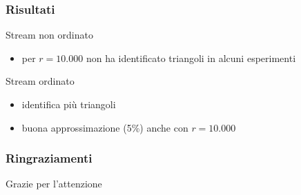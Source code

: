 \documentclass{beamer}
\begin{document}
\begin{frame}
\frametitle{Risultati}

Stream non ordinato

\begin{itemize}
    \item per $r = 10.000$ non ha identificato triangoli in alcuni esperimenti
\end{itemize}

Stream ordinato

\begin{itemize}
    \item identifica più triangoli
    \item buona approssimazione (5\%) anche con $r=10.000$
\end{itemize}

\end{frame}


\begin{frame}
\frametitle{Ringraziamenti}

Grazie per l'attenzione

\end{frame}
\end{document}
